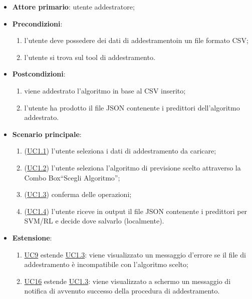 		\begin{itemize}
			\item\textbf{Attore primario}: utente addestratore;
			\item\textbf{Precondizioni}:
				\begin{enumerate}
					\item l’utente deve possedere dei dati di addestramento\glo in un file formato CSV\glo;
					\item l’utente si trova sul tool di addestramento.
				\end{enumerate}
			\item\textbf{Postcondizioni}:
				\begin{enumerate}
					\item viene addestrato l'algoritmo in base al CSV inserito;
					\item l'utente ha prodotto il file JSON contenente i predittori dell'algoritmo addestrato.
				\end{enumerate}
			\item\textbf{Scenario principale}:
				\begin{enumerate}
					\item (\hyperref[par:UC1.1]{UC1.1}) l’utente seleziona i dati di addestramento da caricare;
					\item (\hyperref[par:UC1.2]{UC1.2}) l’utente seleziona l’algoritmo di previsione scelto attraverso la Combo Box\glo “Scegli Algoritmo”;
					\item (\hyperref[par:UC1.3]{UC1.3}) conferma delle operazioni;
					\item (\hyperref[par:UC1.4]{UC1.4}) l’utente riceve in output il file JSON contenente i predittori per SVM/RL e decide dove salvarlo (localmente).
				\end{enumerate}
			\item\textbf{Estensione}: 
\begin{enumerate}
\item\hyperref[par:UC9]{UC9} estende \hyperref[par:UC1.3]{UC1.3}: viene visualizzato un messaggio d’errore se il file di addestramento è incompatibile con l’algoritmo scelto;
			\item\hyperref[par:UC16]{UC16} estende \hyperref[par:UC1.3]{UC1.3}: viene visualizzato a schermo un messaggio di notifica di avvenuto successo della procedura di addestramento.
			\end{enumerate}
		\end{itemize}
		
		\label{par:UC1.1}
